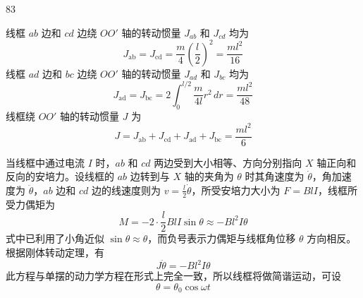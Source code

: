 \begin{solution}{83}
    \begin{subsolution}
        \begin{subsubsolution}
            线框 $ab$ 边和 $cd$ 边绕 $OO'$ 轴的转动惯量 $J_{ab}$ 和 $J_{cd}$ 均为
            \begin{equation}
                J_{\mathrm{ab}} = J_{\mathrm{cd}} = \frac{m}{4} \left(\frac{l}{2}\right)^{2} = \frac{m l^{2}}{16}
                \label{eq:1.s83}
            \end{equation}
            线框 $ad$ 边和 $bc$ 边绕 $OO'$ 轴的转动惯量 $J_{ad}$ 和 $J_{bc}$ 均为
            \begin{equation}
                J_{\mathrm{ad}} = J_{\mathrm{bc}} = 2 \int_{0}^{l/2} \frac{m}{4l} r^{2} \,dr = \frac{m l^{2}}{48}
                \label{eq:2.s83}
            \end{equation}
            线框绕 $OO'$ 轴的转动惯量 $J$ 为
            \begin{equation}
                J = J_{\mathrm{ab}} + J_{\mathrm{cd}} + J_{\mathrm{ad}} + J_{\mathrm{bc}} = \frac{m l^{2}}{6}
                \label{eq:3.s83}
            \end{equation}
        \end{subsubsolution}
        \begin{subsubsolution}
            当线框中通过电流 $I$ 时，$ab$ 和 $cd$ 两边受到大小相等、方向分别指向 $X$ 轴正向和反向的安培力。设线框的 $ab$ 边转到与 $X$ 轴的夹角为 $\theta$ 时其角速度为 $\dot{\theta}$，角加速度为 $\ddot{\theta}$，$ab$ 边和 $cd$ 边的线速度则为 $v = \frac{l}{2}\dot{\theta}$，所受安培力大小为 $F = B l I$，线框所受力偶矩为
            \begin{equation}
                M = -2 \cdot \frac{l}{2} B l I \sin\theta \approx - B l^{2} I \theta
                \label{eq:4.s83}
            \end{equation}
            式中已利用了小角近似 $\sin\theta\approx\theta$，而负号表示力偶矩与线框角位移 $\theta$ 方向相反。根据刚体转动定理，有
            \begin{equation}
                J \ddot{\theta} = - B l^{2} I \theta
                \label{eq:5.s83}
            \end{equation}
            此方程与单摆的动力学方程在形式上完全一致，所以线框将做简谐运动，可设
            \begin{equation}
                \theta = \theta_{0} \cos \omega t
                \label{eq:6.s83}
            \end{equation}

\end{subsubsolution}
\end{subsolution}
\end{solution}
